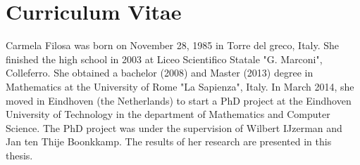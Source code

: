\chapter*{Curriculum Vitae}
Carmela Filosa was born on November 28, 1985 in Torre del greco, Italy. She finished the high school in 2003 at Liceo Scientifico Statale "G. Marconi", Colleferro. She obtained a bachelor (2008) and Master (2013) degree in Mathematics at the University of Rome "La Sapienza", Italy. In March 2014, she moved in Eindhoven (the Netherlands) to start a PhD project at the Eindhoven University of Technology in the department of Mathematics and Computer Science. The PhD project was under the supervision of Wilbert IJzerman and Jan ten Thije Boonkkamp. 
The results of her research are presented in this thesis.  


